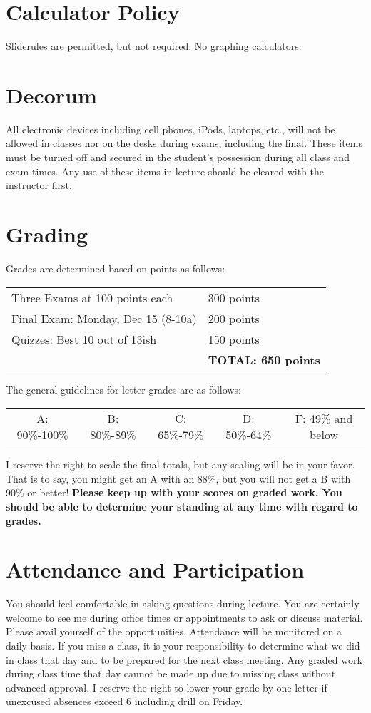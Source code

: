 \documentclass[margin,line,pifont,palatino,courier]{res}
\begin{document}
\begin{resume}
\section{\sc Calculator Policy} Sliderules are permitted, but not required.  No graphing calculators.

\section{\sc Decorum} All electronic devices including cell phones, iPods, laptops, etc., will not be allowed in classes nor on the desks during exams, including the final.  These items must be turned off and secured in the student's possession during all class and exam times.  Any use of these items in lecture should be cleared with the instructor first.

\section{\sc Grading} Grades are determined based on points as follows:

\begin{supertabular}{@{}ll}
Three Exams at 100 points each & 300 points \\
Final Exam: Monday, Dec 15 (8-10a) & 200 points \\
Quizzes: Best 10 out of 13ish & 150 points \\
 & {\bf TOTAL: 650 points} \\
\end{supertabular}

The general guidelines for letter grades are as follows:

\begin{tabular}{c c c c c}
A: 90\%-100\% & B: 80\%-89\% & C: 65\%-79\% & D: 50\%-64\% & F: 49\% and below
\end{tabular}

I reserve the right to scale the final totals, but any scaling will be in your favor.  That is to say, you might get an A with an 88\%, but you will not get a B with 90\% or better! {\bf Please keep up with your scores on graded work.  You should be able to determine your standing at any time with regard to grades.}

\section{\sc Attendance and Participation}

You should feel comfortable in asking questions during lecture.  You are certainly welcome to see me during office times or appointments to ask or discuss material.  Please avail yourself of the opportunities.  Attendance will be monitored on a daily basis.  If you miss a class, it is your responsibility to determine what we did in class that day and to be prepared for the next class meeting.  Any graded work during class time that day cannot be made up due to missing class without advanced approval.  I reserve the right to lower your grade by one letter if unexcused absences exceed 6 including drill on Friday.
 

\end{resume}
\end{document}
